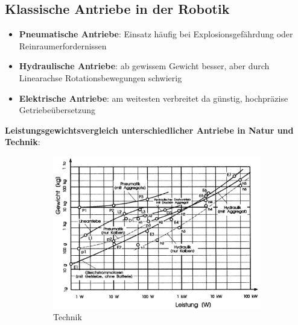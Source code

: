 \subsection{Klassische Antriebe in der Robotik}
\begin{itemize}
	\item \textbf{Pneumatische Antriebe}: Einsatz häufig bei Explosionsgefährdung oder Reinraumerfordernissen 
	\item \textbf{Hydraulische Antriebe}: ab gewissem Gewicht besser, aber durch Linearachse Rotationsbewegungen schwierig
	\item \textbf{Elektrische Antriebe}: am weitesten verbreitet  da günstig, hochpräzise Getriebeübersetzung
\end{itemize}
\textbf{Leistungsgewichtsvergleich unterschiedlicher Antriebe in Natur und Technik}:
\begin{figure}[h!]
	\centering
	\begin{subfigure}{.5\textwidth}
		\includegraphics[width=\linewidth]{figures/ch03_klassische-antriebe.png}
		\caption{Technik}
	\end{subfigure}
	\begin{subfigure}{.5\textwidth}

\end{subfigure}
\end{figure}
